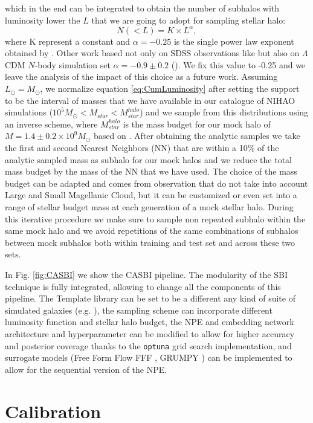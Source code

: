 which in the end can be integrated to obtain the number of subhalos with luminosity lower the $L$ that we are going to adopt for sampling stellar halo:
\begin{equation}
    N(<L) = K \times L^{\alpha},
\label{eq:CumLuminosity}
\end{equation}
where K represent a constant and $\alpha=-0.25$ is the single power law exponent obtained by \cite{koposovLuminosityFunctionMilky2008}. Other work based not only on SDSS observations like \cite{koposovLuminosityFunctionMilky2008} but also on $\Lambda$CDM $N$-body simulation set $\alpha = -0.9 \pm 0.2$ (\cite{tollerudHundredsMilkyWay2008}). We fix this value to -0.25 and we leave the analysis of the impact of this choice as a future work.
Assuming $L_\odot = M_\odot$, we normalize equation \ref{eq:CumLuminosity} after setting the support to be the interval of masses that we have available in our catalogue of NIHAO simulations ($10^5 M_\odot < M_{star} < M_{star}^{halo}$) and we sample from this distributions using an inverse scheme, where $ M_{star}^{halo}$ is the mass budget for our mock halo of $M=1.4 \pm 0.2 \times 10^9 M_\odot$ based on \cite{deasonTotalStellarHalo2019}. After obtaining the analytic samples we take the first and second Nearest Neighbors (NN) that are within a 10\% of the analytic sampled mass as subhalo for our mock halos and we reduce the total mass budget by the mass of the NN that we have used. The choice of the mass budget can be adapted and comes from observation that do not take into account Large and Small Magellanic Cloud, but it can be customized or even set into a range of stellar budget mass at each generation of a mock stellar halo. During this iterative procedure we make sure to sample non repeated subhalo within the same mock halo and we avoid repetitions of the same combinations of subhalos between mock subhalos both within training and test set and across these two sets.

In Fig. \ref{fig:CASBI} we show the CASBI pipeline. The modularity of the SBI technique is fully integrated, allowing to change all the components of this pipeline. The Template library can be set to be a different any kind of suite of simulated galaxies (e.g. \cite{pillepichMilkyWayAndromeda2023}), the sampling scheme can incorporate different luminosity function and stellar halo budget, the NPE and embedding network architecture and hyperparameter can be modified to allow for higher accuracy and posterior coverage thanks to the \texttt{optuna} grid search implementation, and surrogate models (Free Form Flow FFF \cite{draxlerFreeformFlowsMake2024}, GRUMPY \cite{kravtsovGRUMPYSimpleFramework2022}) can be implemented to allow for the sequential version of the NPE.      


\section{Calibration}


